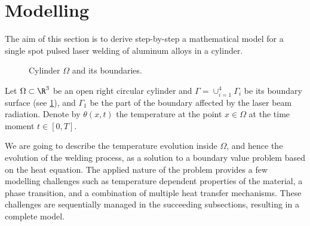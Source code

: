 \section{Modelling}
\label{sec:modelling}

The aim of this section is to derive step-by-step a mathematical model for a single spot pulsed laser welding of aluminum alloys in a cylinder.

\begin{figure}[ht]
	\centering
	
	\caption{Cylinder $\Omega$ and its boundaries.}
	\label{fig:cylinder}
\end{figure}

Let $\Omega	\subset \R^3$ be an open right circular cylinder and $\Gamma = \cup_{i=1}^4 \Gamma_i$ be its boundary surface (see \cref{fig:cylinder}), and $\Gamma_1$ be the part of the boundary affected by the laser beam radiation.
Denote by $\theta(x,t)$ the temperature at the point $x \in \Omega$ at the time moment $t \in [0,T]$.

We are going to describe the temperature evolution inside $\Omega$, and hence the evolution of the welding process, as a solution to a boundary value problem based on the heat equation.
The applied nature of the problem provides a few modelling challenges such as temperature dependent properties of the material, a phase transition, and a combination of multiple heat transfer mechanisms.
These challenges are sequentially managed in the succeeding subsections, resulting in a complete model.



